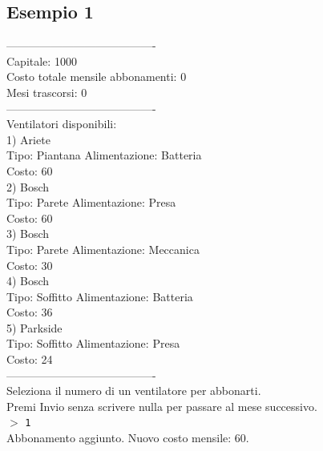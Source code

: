 \documentclass{article}
\begin{document}
\subsection*{Esempio 1}
\begin{tcolorbox}
---------------------------------------- \\
Capitale: 1000 \\
Costo totale mensile abbonamenti: 0 \\
Mesi trascorsi: 0 \\
---------------------------------------- \\
Ventilatori disponibili: \\
1) Ariete \\
Tipo: Piantana Alimentazione: Batteria \\
Costo: 60 \\
2) Bosch \\
Tipo: Parete Alimentazione: Presa \\
Costo: 60 \\
3) Bosch \\
Tipo: Parete Alimentazione: Meccanica \\
Costo: 30 \\
4) Bosch \\
Tipo: Soffitto Alimentazione: Batteria \\
Costo: 36 \\
5) Parkside \\
Tipo: Soffitto Alimentazione: Presa \\
Costo: 24 \\
---------------------------------------- \\
Seleziona il numero di un ventilatore per abbonarti. \\
Premi Invio senza scrivere nulla per passare al mese successivo. \\
\(>\) \texttt{1} \\
Abbonamento aggiunto. Nuovo costo mensile: 60. \\
\end{tcolorbox}
\end{document}
